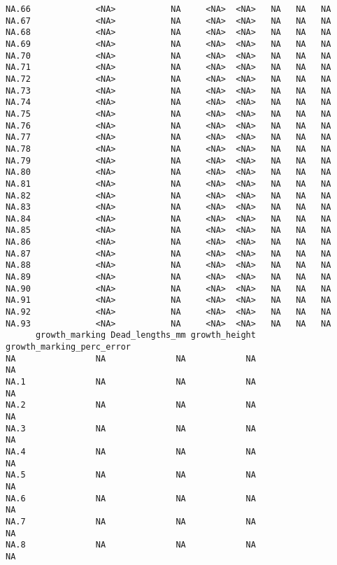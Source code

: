 \documentclass[
  letterpaper,
  DIV=11,
  numbers=noendperiod]{scrartcl}
\begin{document}
\begin{verbatim}
NA.66             <NA>           NA     <NA>  <NA>   NA   NA   NA
NA.67             <NA>           NA     <NA>  <NA>   NA   NA   NA
NA.68             <NA>           NA     <NA>  <NA>   NA   NA   NA
NA.69             <NA>           NA     <NA>  <NA>   NA   NA   NA
NA.70             <NA>           NA     <NA>  <NA>   NA   NA   NA
NA.71             <NA>           NA     <NA>  <NA>   NA   NA   NA
NA.72             <NA>           NA     <NA>  <NA>   NA   NA   NA
NA.73             <NA>           NA     <NA>  <NA>   NA   NA   NA
NA.74             <NA>           NA     <NA>  <NA>   NA   NA   NA
NA.75             <NA>           NA     <NA>  <NA>   NA   NA   NA
NA.76             <NA>           NA     <NA>  <NA>   NA   NA   NA
NA.77             <NA>           NA     <NA>  <NA>   NA   NA   NA
NA.78             <NA>           NA     <NA>  <NA>   NA   NA   NA
NA.79             <NA>           NA     <NA>  <NA>   NA   NA   NA
NA.80             <NA>           NA     <NA>  <NA>   NA   NA   NA
NA.81             <NA>           NA     <NA>  <NA>   NA   NA   NA
NA.82             <NA>           NA     <NA>  <NA>   NA   NA   NA
NA.83             <NA>           NA     <NA>  <NA>   NA   NA   NA
NA.84             <NA>           NA     <NA>  <NA>   NA   NA   NA
NA.85             <NA>           NA     <NA>  <NA>   NA   NA   NA
NA.86             <NA>           NA     <NA>  <NA>   NA   NA   NA
NA.87             <NA>           NA     <NA>  <NA>   NA   NA   NA
NA.88             <NA>           NA     <NA>  <NA>   NA   NA   NA
NA.89             <NA>           NA     <NA>  <NA>   NA   NA   NA
NA.90             <NA>           NA     <NA>  <NA>   NA   NA   NA
NA.91             <NA>           NA     <NA>  <NA>   NA   NA   NA
NA.92             <NA>           NA     <NA>  <NA>   NA   NA   NA
NA.93             <NA>           NA     <NA>  <NA>   NA   NA   NA
      growth_marking Dead_lengths_mm growth_height growth_marking_perc_error
NA                NA              NA            NA                        NA
NA.1              NA              NA            NA                        NA
NA.2              NA              NA            NA                        NA
NA.3              NA              NA            NA                        NA
NA.4              NA              NA            NA                        NA
NA.5              NA              NA            NA                        NA
NA.6              NA              NA            NA                        NA
NA.7              NA              NA            NA                        NA
NA.8              NA              NA            NA                        NA

\end{verbatim}
\end{document}
